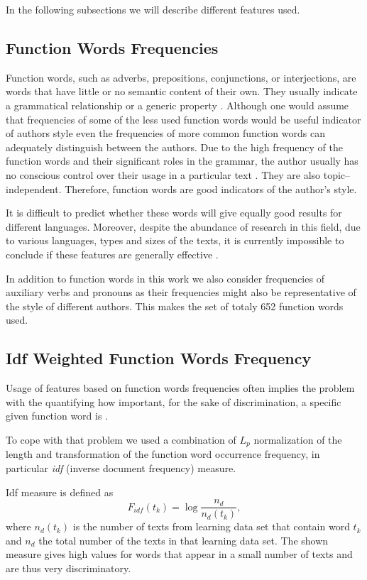 \documentclass{llncs}
\begin{document}
In the following subsections we will describe different features used.

\subsection{Function Words Frequencies}
\label{sec:funkcijske-rijeci}
Function words, such as adverbs, prepositions, conjunctions, or interjections,
are words that have little or no semantic content of their own. They usually
indicate a grammatical relationship or a generic property
\cite{zhao2005effective}. Although one would assume that frequencies of some of
the less used function words would be useful indicator of authors style even the
frequencies of more common function words can adequately distinguish between the
authors. Due to the high frequency of the function words and their significant
roles in the grammar, the author usually has no conscious control over their
usage in a particular text \cite{argamon2005measuring}. They are also
topic--independent. Therefore, function words are good indicators of the author's
style.

It is difficult to predict whether these words will give equally good results for
different languages. Moreover, despite the abundance of research in this field,
due to various languages, types and sizes of the texts, it is currently
impossible to conclude if these features are generally effective
\cite{zhao2005effective}.

In addition to function words in this work we also consider frequencies of
auxiliary verbs and pronouns as their frequencies might also be
representative of the style of different authors. This makes the set of totaly
652 function words used.

\subsection{Idf Weighted Function Words Frequency}
\label{sec:funkcijske-rijeci-idf}

Usage of features based on function words frequencies often implies the
problem with the quantifying how important, for the sake of discrimination, a
specific given function word is \cite{diederich2003authorship}.

To cope with that problem we used a combination of $L_p$ normalization of the
length and transformation of the function word occurrence frequency, in
particular \emph{idf} (inverse document frequency) measure.

Idf measure is defined as \cite{diederich2003authorship}
\begin{equation}
F_{idf}(t_k) = \log \frac{n_d}{n_d(t_k)},
\label{equ:idf}
\end{equation}
where $n_d(t_k)$ is the number of texts from learning data set that contain word
$t_k$ and $n_d$ the total number of the texts in that learning data set. The
shown measure gives high values for words that appear in a small number of
texts and are thus very discriminatory.
\end{document}
